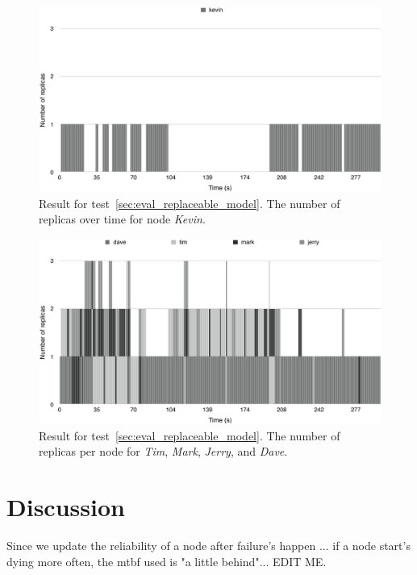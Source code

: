 \documentclass{cslthse-msc}
\begin{document}
\begin{figure}[!hbt]
\centering
\includegraphics[scale=0.5]{images/results/loads/loaded.pdf}
\caption{Result for test~\ref{sec:eval_replaceable_model}. The number of replicas over time for node \emph{Kevin}.} \label{fig:eval_replaceable_model_loaded}
\end{figure}

\begin{figure}[!hbt]
\centering
\includegraphics[scale=0.5]{images/results/loads/unloaded.pdf}
\caption{Result for test~\ref{sec:eval_replaceable_model}. The number of replicas per node for \emph{Tim}, \emph{Mark}, \emph{Jerry}, and \emph{Dave}.} \label{fig:eval_replaceable_model_unloaded}
\end{figure}

\chapter{Discussion} \label{ch:discussion}
Since we update the reliability of a node after failure's happen ... if a node start's dying more often, the mtbf used is "a little behind"... EDIT ME.
\end{document}
